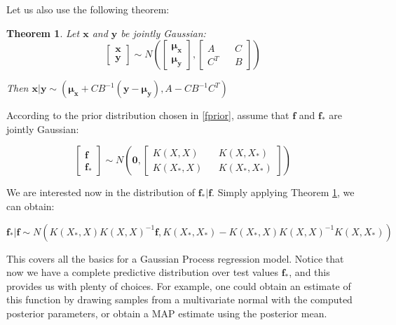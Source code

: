 \documentclass[10pt,a4paper,twoside]{book}
\newtheorem{mydef}{Theorem}
\begin{document}
Let us also use the following theorem:

\begin{mydef}
\label{conditioning}
Let $\boldsymbol{x}$ and $\boldsymbol{y}$ be jointly Gaussian:
\begin{equation}
\begin{bmatrix}
\boldsymbol{x}\\
\boldsymbol{y}
\end{bmatrix} \sim N\left(
\begin{bmatrix}
\boldsymbol{\mu_x}\\
\boldsymbol{\mu_y}
\end{bmatrix},
\begin{bmatrix}
A   && C \\
C^T && B
\end{bmatrix}
\right)
\end{equation}

Then $\boldsymbol{x|y} \sim \left(\boldsymbol{\mu_x} + C B^{-1}(\boldsymbol{y} - \boldsymbol{\mu_y}), A - CB^{-1}C^T \right)$
\end{mydef}

According to the prior distribution chosen in \ref{fprior}, assume that $\boldsymbol{f}$ and $\boldsymbol{f_*}$ are jointly Gaussian:

\begin{equation}
\begin{bmatrix}
\boldsymbol{f}\\
\boldsymbol{f_*}
\end{bmatrix} \sim N\left(
\boldsymbol{0},
\begin{bmatrix}
K(X, X)  && K(X, X_*) \\
K(X_*, X) && K(X_*, X_*)
\end{bmatrix}
\right)
\end{equation}


We are interested now in the distribution of $\boldsymbol{f_{*}}|\boldsymbol{f}$. Simply applying Theorem \ref{conditioning}, we can obtain:

\begin{equation}
\boldsymbol{f_*|f} \sim N\left(K(X_*, X)K(X, X)^{-1}\boldsymbol{f}, K(X_*, X_*) - K(X_*, X)K(X, X)^{-1}K(X, X_*) \right)
\end{equation}

This covers all the basics for a Gaussian Process regression model. Notice that now we have a complete predictive distribution over test values $\boldsymbol{f_{*}}$, and this provides us with plenty of choices. For example, one could obtain an estimate of this function by drawing samples from a multivariate normal with the computed posterior parameters, or obtain a MAP estimate using the posterior mean.\\
\end{document}
